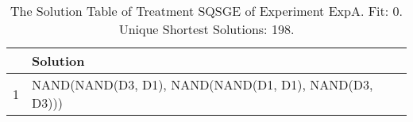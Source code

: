 \begin{table}[ht]
\centering
\begin{tabular}{rp{9cm}}
  \hline
 & Solution \\ 
  \hline
1 & NAND(NAND(D3, D1), NAND(NAND(D1, D1), NAND(D3, D3))) \\ 
   \hline
\end{tabular}
\caption{The Solution Table of Treatment SQSGE of Experiment ExpA. Fit: 0. Unique Shortest Solutions: 198.} 
\end{table}

